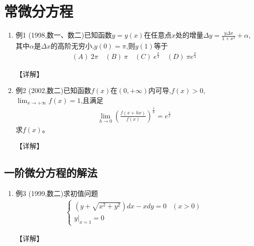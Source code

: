 \documentclass[12pt, a4paper, oneside, UTF8]{ctexbook}
\begin{document}

\else
\fi

\chapter{常微分方程}
\begin{enumerate}[label=\arabic*.]
    \item 例1 (1998,数一、数二)已知函数$y=y(x)$在任意点$x$处的增量$\Delta y=\frac{y\Delta x}{1+x^2}+\alpha$,其中$\alpha$是$\Delta x$的高阶无穷小,$y(0)=\pi$,则$y(1)$等于
    \begin{align*}
        (A)\ 2\pi \quad (B)\ \pi \quad (C)\ e^{\frac{\pi}{4}} \quad (D)\ \pi e^{\frac{\pi}{4}}
    \end{align*}
    
    \begin{solution}
    【详解】
    \end{solution}
    
    \item 例2 (2002,数二)已知函数$f(x)$在$(0,+\infty)$内可导,$f(x)>0$,$\lim_{x\to+\infty}f(x)=1$,且满足
    \begin{align*}
        \lim_{h\to0}\left(\frac{f(x+hx)}{f(x)}\right)^{\frac{1}{h}}=e^{\frac{1}{x}}
    \end{align*}
    求$f(x)$。
    
    \begin{solution}
    【详解】
    \end{solution}
\end{enumerate}

\section{ 一阶微分方程的解法}

\begin{remark}
\end{remark}

\begin{enumerate}[label=\arabic*.,start=3]
    \item 例3 (1999,数二)求初值问题
    \begin{align*}
        \begin{cases}
            (y+\sqrt{x^2+y^2})dx-xdy=0 & (x>0) \\
            y|_{x=1}=0
        \end{cases}
    \end{align*}
    
    \begin{solution}
    【详解】
    \end{solution}
\end{enumerate}
\end{document}
